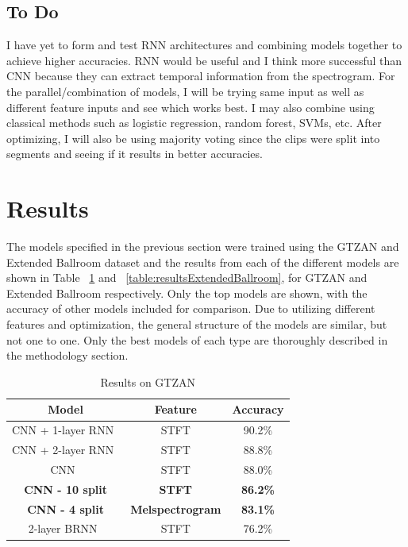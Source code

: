 \documentclass[10pt,twocolumn,letterpaper]{article}
\begin{document}
	\subsection{To Do}
	
	I have yet to form and test RNN architectures and combining models together to achieve higher accuracies. RNN would be useful and I think more successful than CNN because they can extract temporal information from the spectrogram. For the parallel/combination of models, I will be trying same input as well as different feature inputs and see which works best. I may also combine using classical methods such as logistic regression, random forest, SVMs, etc. After optimizing, I will also be using majority voting since the clips were split into segments and seeing if it results in better accuracies.
	
	\section{Results}
	
	The models specified in the previous section were trained using the GTZAN and Extended Ballroom dataset and the results from each of the different models are shown in Table ~\ref{table:resultsGTZAN} and ~\ref{table:resultsExtendedBallroom}, for GTZAN and Extended Ballroom respectively. Only the top models are shown, with the accuracy of other models included for comparison. Due to utilizing different features and optimization, the general structure of the models are similar, but not one to one. Only the best models of each type are thoroughly described in the methodology section.
	
	\begin{table}[!htbp] %
	\caption{Results on GTZAN}
	\centering
		\begin{tabular}[b]{ccc}
			\hline \hline
			Model & Feature & Accuracy 	\\ [0.5ex]
			\hline
			CNN + 1-layer RNN~\cite{yang2020parallel} & STFT & 90.2\%			\\
			CNN + 2-layer RNN~\cite{yang2020parallel} & STFT & 88.8\%			\\
			CNN~\cite{yang2020parallel} & STFT & 88.0\%							\\
			\textbf{CNN - 10 split} & \textbf{STFT} & \textbf{86.2\%} 					\\
			\textbf{CNN - 4 split} & \textbf{Melspectrogram} & \textbf{83.1\%} 			\\
			2-layer BRNN~\cite{schuster1997bidirectional} & STFT & 76.2\% 		\\
			[1ex]
		\end{tabular}
	\label{table:resultsGTZAN}
	\end{table}
\end{document}
